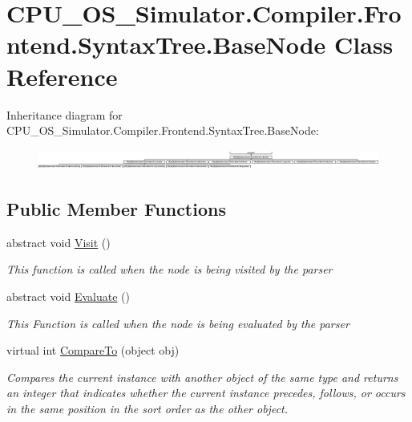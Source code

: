 \hypertarget{class_c_p_u___o_s___simulator_1_1_compiler_1_1_frontend_1_1_syntax_tree_1_1_base_node}{}\section{C\+P\+U\+\_\+\+O\+S\+\_\+\+Simulator.\+Compiler.\+Frontend.\+Syntax\+Tree.\+Base\+Node Class Reference}
\label{class_c_p_u___o_s___simulator_1_1_compiler_1_1_frontend_1_1_syntax_tree_1_1_base_node}
Inheritance diagram for C\+P\+U\+\_\+\+O\+S\+\_\+\+Simulator.\+Compiler.\+Frontend.\+Syntax\+Tree.\+Base\+Node\+:\begin{figure}[H]
\begin{center}
\leavevmode
\includegraphics[height=0.668258cm]{class_c_p_u___o_s___simulator_1_1_compiler_1_1_frontend_1_1_syntax_tree_1_1_base_node}
\end{center}
\end{figure}
\subsection*{Public Member Functions}
\begin{DoxyCompactItemize}
\item 
abstract void \hyperlink{class_c_p_u___o_s___simulator_1_1_compiler_1_1_frontend_1_1_syntax_tree_1_1_base_node_a092377df64002c5e9c023a259e5e11d0}{Visit} ()
\begin{DoxyCompactList}\small\item\em This function is called when the node is being visited by the parser \end{DoxyCompactList}\item 
abstract void \hyperlink{class_c_p_u___o_s___simulator_1_1_compiler_1_1_frontend_1_1_syntax_tree_1_1_base_node_a6cfcf8a0795180bdb1c7f0735d39441b}{Evaluate} ()
\begin{DoxyCompactList}\small\item\em This Function is called when the node is being evaluated by the parser \end{DoxyCompactList}\item 
virtual int \hyperlink{class_c_p_u___o_s___simulator_1_1_compiler_1_1_frontend_1_1_syntax_tree_1_1_base_node_a56a5aff4b4b7da820c6b88854d2c0fc0}{Compare\+To} (object obj)
\begin{DoxyCompactList}\small\item\em Compares the current instance with another object of the same type and returns an integer that indicates whether the current instance precedes, follows, or occurs in the same position in the sort order as the other object. \end{DoxyCompactList}\end{DoxyCompactItemize}
